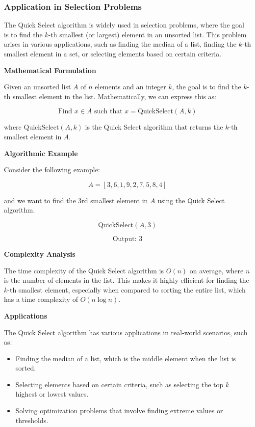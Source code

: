 \documentclass[12pt]{book} %
\begin{document}
\subsubsection{Application in Selection Problems}
The Quick Select algorithm is widely used in selection problems, where the goal is to find the $k$-th smallest (or largest) element in an unsorted list. This problem arises in various applications, such as finding the median of a list, finding the $k$-th smallest element in a set, or selecting elements based on certain criteria.

\textbf{Mathematical Formulation}

Given an unsorted list $A$ of $n$ elements and an integer $k$, the goal is to find the $k$-th smallest element in the list. Mathematically, we can express this as:

\[
\text{Find } x \in A \text{ such that } x = \text{QuickSelect}(A, k)
\]

where $\text{QuickSelect}(A, k)$ is the Quick Select algorithm that returns the $k$-th smallest element in $A$.

\textbf{Algorithmic Example}

Consider the following example:

\[
A = [3, 6, 1, 9, 2, 7, 5, 8, 4]
\]

and we want to find the 3rd smallest element in $A$ using the Quick Select algorithm.

\[
\text{QuickSelect}(A, 3)
\]

\[
\text{Output: } 3
\]

\textbf{Complexity Analysis}

The time complexity of the Quick Select algorithm is $O(n)$ on average, where $n$ is the number of elements in the list. This makes it highly efficient for finding the $k$-th smallest element, especially when compared to sorting the entire list, which has a time complexity of $O(n \log n)$.

\textbf{Applications}

The Quick Select algorithm has various applications in real-world scenarios, such as:

\begin{itemize}
    \item Finding the median of a list, which is the middle element when the list is sorted.
    \item Selecting elements based on certain criteria, such as selecting the top $k$ highest or lowest values.
    \item Solving optimization problems that involve finding extreme values or thresholds.
\end{itemize}
\end{document}
